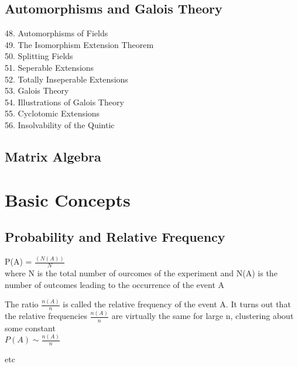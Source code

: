\documentclass{article}
\begin{document}
\begin{spacing}{1.1}
\subsection{Automorphisms and Galois Theory}
48. Automorphisms of Fields
\\ 49. The Isomorphism Extension Theorem
\\ 50. Splitting Fields
\\ 51. Seperable Extensions
\\ 52. Totally Inseperable Extensions
\\ 53. Galois Theory
\\ 54. Illustrations of Galois Theory
\\ 55. Cyclotomic Extensions
\\ 56. Insolvability of the Quintic

\subsection{Matrix Algebra}

\clearpage


\section{Basic Concepts}
\subsection{Probability and Relative Frequency}
P(A) = $\frac{(N(A))}{N}$ 
\\ where N is the total number of ourcomes of the experiment and N(A) is the number of outcomes leading to the occurrence of the event A

The ratio $\frac{n(A)}{n}$ is called the relative frequency of the event A.  It turns out that the relative frequencies $\frac{n(A)}{n}$ are virtually the same for large n, clustering about some constant
\\ $P(A)\sim \frac{n(A)}{n}$



etc

\end{spacing}
\end{document}
